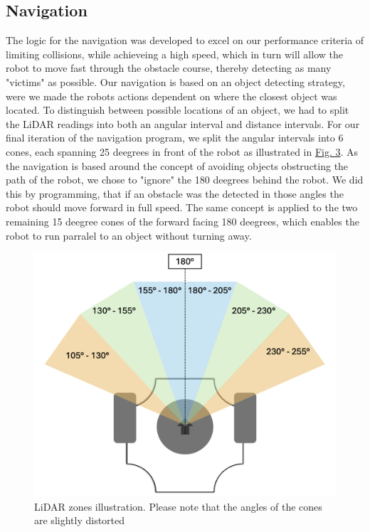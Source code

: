 \documentclass[conference]{IEEEtran}
\begin{document}
\subsection{Navigation}
The logic for the navigation was developed to excel on our performance criteria of limiting collisions, while achieveing a high speed, which in turn will allow the robot to move fast through the obstacle course, thereby detecting as many "victims" as possible.
Our navigation is based on an object detecting strategy, were we made the robots actions dependent on where the closest object was located.
To distinguish between possible locations of an object, we had to split the LiDAR readings into both an angular interval and distance intervals.
For our final iteration of the navigation program, we split the angular intervals into 6 cones, each spanning 25 deegrees in front of the robot as illustrated in \href{sec:angles}{Fig. 3}. 
As the navigation is based around the concept of avoiding objects obstructing the path of the robot, we chose to "ignore" the 180 deegrees behind the robot. 
We did this by programming, that if an obstacle was the detected in those angles the robot should move forward in full speed.
The same concept is applied to the two remaining 15 deegree cones of the forward facing 180 deegrees, which enables the robot to run parralel to an object without turning away.
\begin{figure}[htbp]
    \centerline{\includegraphics[width=0.9\columnwidth]{Pictures/LiDAR Angels.png}}
    \caption{LiDAR zones illustration. Please note that the angles of the cones are slightly distorted}
    \label{sec:angles}
    \end{figure}
\end{document}
